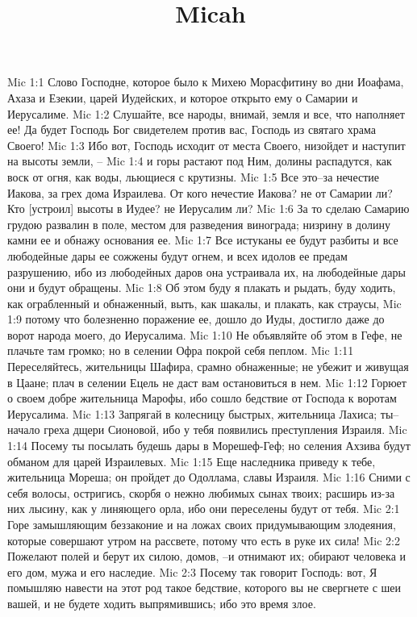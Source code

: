 

\title{Micah}

Mic 1:1  Слово Господне, которое было к Михею Морасфитину во дни Иоафама, Ахаза и Езекии, царей Иудейских, и которое открыто ему о Самарии и Иерусалиме.
Mic 1:2  Слушайте, все народы, внимай, земля и все, что наполняет ее! Да будет Господь Бог свидетелем против вас, Господь из святаго храма Своего!
Mic 1:3  Ибо вот, Господь исходит от места Своего, низойдет и наступит на высоты земли, --
Mic 1:4  и горы растают под Ним, долины распадутся, как воск от огня, как воды, льющиеся с крутизны.
Mic 1:5  Все это--за нечестие Иакова, за грех дома Израилева. От кого нечестие Иакова? не от Самарии ли? Кто [устроил] высоты в Иудее? не Иерусалим ли?
Mic 1:6  За то сделаю Самарию грудою развалин в поле, местом для разведения винограда; низрину в долину камни ее и обнажу основания ее.
Mic 1:7  Все истуканы ее будут разбиты и все любодейные дары ее сожжены будут огнем, и всех идолов ее предам разрушению, ибо из любодейных даров она устраивала их, на любодейные дары они и будут обращены.
Mic 1:8  Об этом буду я плакать и рыдать, буду ходить, как ограбленный и обнаженный, выть, как шакалы, и плакать, как страусы,
Mic 1:9  потому что болезненно поражение ее, дошло до Иуды, достигло даже до ворот народа моего, до Иерусалима.
Mic 1:10  Не объявляйте об этом в Гефе, не плачьте там громко; но в селении Офра покрой себя пеплом.
Mic 1:11  Переселяйтесь, жительницы Шафира, срамно обнаженные; не убежит и живущая в Цаане; плач в селении Ецель не даст вам остановиться в нем.
Mic 1:12  Горюет о своем добре жительница Марофы, ибо сошло бедствие от Господа к воротам Иерусалима.
Mic 1:13  Запрягай в колесницу быстрых, жительница Лахиса; ты--начало греха дщери Сионовой, ибо у тебя появились преступления Израиля.
Mic 1:14  Посему ты посылать будешь дары в Морешеф-Геф; но селения Ахзива будут обманом для царей Израилевых.
Mic 1:15  Еще наследника приведу к тебе, жительница Мореша; он пройдет до Одоллама, славы Израиля.
Mic 1:16  Сними с себя волосы, остригись, скорбя о нежно любимых сынах твоих; расширь из-за них лысину, как у линяющего орла, ибо они переселены будут от тебя.
Mic 2:1  Горе замышляющим беззаконие и на ложах своих придумывающим злодеяния, которые совершают утром на рассвете, потому что есть в руке их сила!
Mic 2:2  Пожелают полей и берут их силою, домов, --и отнимают их; обирают человека и его дом, мужа и его наследие.
Mic 2:3  Посему так говорит Господь: вот, Я помышляю навести на этот род такое бедствие, которого вы не свергнете с шеи вашей, и не будете ходить выпрямившись; ибо это время злое.

